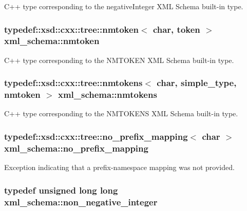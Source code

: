 C++ type corresponding to the negative\-Integer X\-M\-L Schema built-\/in type. 

\hypertarget{namespacexml__schema_af60189e21a69b126898eb625992ff730}{
\subsubsection[{nmtoken}]{\setlength{\rightskip}{0pt plus 5cm}typedef\-::xsd\-::cxx\-::tree\-::nmtoken$<$ char, {\bf token} $>$ {\bf xml\-\_\-schema\-::nmtoken}}}\label{namespacexml__schema_af60189e21a69b126898eb625992ff730}


C++ type corresponding to the N\-M\-T\-O\-K\-E\-N X\-M\-L Schema built-\/in type. 

\hypertarget{namespacexml__schema_ab2ece9a172d690c8276a27fa696a3b43}{
\subsubsection[{nmtokens}]{\setlength{\rightskip}{0pt plus 5cm}typedef\-::xsd\-::cxx\-::tree\-::nmtokens$<$ char, {\bf simple\-\_\-type}, {\bf nmtoken} $>$ {\bf xml\-\_\-schema\-::nmtokens}}}\label{namespacexml__schema_ab2ece9a172d690c8276a27fa696a3b43}


C++ type corresponding to the N\-M\-T\-O\-K\-E\-N\-S X\-M\-L Schema built-\/in type. 

\hypertarget{namespacexml__schema_a103914036487a85ba84743f0e65b1d96}{
\subsubsection[{no\-\_\-prefix\-\_\-mapping}]{\setlength{\rightskip}{0pt plus 5cm}typedef\-::xsd\-::cxx\-::tree\-::no\-\_\-prefix\-\_\-mapping$<$ char $>$ {\bf xml\-\_\-schema\-::no\-\_\-prefix\-\_\-mapping}}}\label{namespacexml__schema_a103914036487a85ba84743f0e65b1d96}


Exception indicating that a prefix-\/namespace mapping was not provided. 

\hypertarget{namespacexml__schema_af42ef5911d65f41a0a03598b056f05aa}{
\subsubsection[{non\-\_\-negative\-\_\-integer}]{\setlength{\rightskip}{0pt plus 5cm}typedef unsigned long long {\bf xml\-\_\-schema\-::non\-\_\-negative\-\_\-integer}}}\label{namespacexml__schema_af42ef5911d65f41a0a03598b056f05aa}


